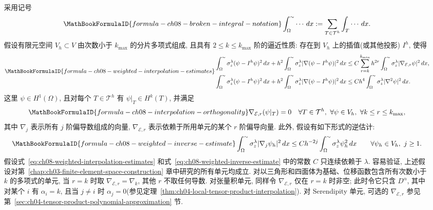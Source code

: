 采用记号
\[
\MathBookFormulaID{formula-ch08-broken-integral-notation}
\int_{\Omega}^{\sim}\cdots\,dx:=\sum_{T\in\mathcal T^h}\int_T\cdots\,dx.
\]
假设有限元空间 $V_h\subset V$ 由次数小于 $k_{\max}$ 的分片多项式组成, 且具有 $2\leq k\leq k_{\max}$ 阶的逼近性质: 存在到 $V_h$ 上的插值(或其他投影) $I^h$, 使得
\begin{equation}
\MathBookFormulaID{formula-ch08-weighted-interpolation-estimates}
\label{eq:ch08-weighted-interpolation-estimates}
\begin{aligned}
&\int_{\Omega}^{\sim}\sigma_z^\lambda(\psi-I^h\psi)^2\,dx
+h^2\int_{\Omega}^{\sim}\sigma_z^\lambda|\nabla(\psi-I^h\psi)|^2\,dx
\leq C\sum_{r=k}^{k_{\max}}h^{2r}\int_{\Omega}^{\sim}\sigma_z^\lambda|\nabla_{\mathcal E,r}\psi|^2\,dx,\\
&\int_{\Omega}^{\sim}\sigma_z^\lambda(\psi-I^h\psi)^2\,dx
+h^2\int_{\Omega}^{\sim}\sigma_z^\lambda|\nabla(\psi-I^h\psi)|^2\,dx
\leq Ch^4\int_{\Omega}^{\sim}\sigma_z^\lambda|\nabla^2\psi|^2\,dx.
\end{aligned}
\end{equation}
这里 $\psi\in H^1(\Omega)$, 且对每个 $T\in\mathcal T^h$ 有 $\psi|_T\in H^k(T)$, 并满足
\begin{equation}
\MathBookFormulaID{formula-ch08-interpolation-orthogonality}
\label{eq:ch08-interpolation-orthogonality}
\nabla_{\mathcal E,r}(\psi|_T)=0
\quad\forall T\in\mathcal T^h,\ \forall\psi\in V_h,\ \forall k\leq r\leq k_{\max},
\end{equation}
其中 $\nabla_j$ 表示所有 $j$ 阶偏导数组成的向量, $\nabla_{\mathcal E,r}$ 表示依赖于所用单元的某个 $r$ 阶偏导向量. 此外, 假设有如下形式的逆估计:
\begin{equation}
\MathBookFormulaID{formula-ch08-weighted-inverse-estimate}
\label{eq:ch08-weighted-inverse-estimate}
\int_{\Omega}^{\sim}\sigma_z^\lambda|\nabla_j\psi_h|^2\,dx
\leq Ch^{-2j}\int_{\Omega}^{\sim}\sigma_z^\lambda\psi_h^2\,dx
\qquad\forall\psi_h\in V_h,\ j\geq1.
\end{equation}
假设式~\eqref{eq:ch08-weighted-interpolation-estimates} 和式~\eqref{eq:ch08-weighted-inverse-estimate} 中的常数 $C$ 只连续依赖于 $\lambda$. 容易验证, 上述假设对第~\ref{chap:ch03-finite-element-space-construction} 章中研究的所有单元均成立. 对以三角形和四面体为基础、位移函数包含所有次数小于 $k$ 的多项式的单元, 当 $r=k$ 时取 $\nabla_{\mathcal E,r}=\nabla_k$, 其他 $r$ 不取任何导数. 对张量积单元, 同样令 $\nabla_{\mathcal E,r}$ 仅在 $r=k$ 时非空; 此时令它只含 $D^\alpha$, 其中对某个 $i$ 有 $\alpha_i=k$, 且当 $j\neq i$ 时 $\alpha_j=0$(参见定理~\ref{thm:ch04-local-tensor-product-interpolation}). 对 Serendipity 单元, 可选的 $\nabla_{\mathcal E,r}$ 参见第~\ref{sec:ch04-tensor-product-polynomial-approximation} 节.

